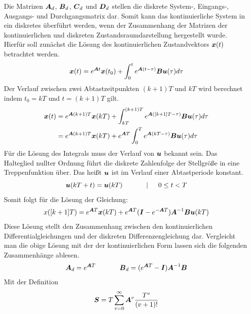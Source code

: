 Die Matrizen $\boldsymbol{A}_d$, $\boldsymbol{B}_d$, $\boldsymbol{C}_d$ und $\boldsymbol{D}_d$ stellen die diskrete System-, Eingangs-, Ausgangs- und Durchgangsmatrix dar. Somit kann das kontinuierliche System in ein diskretes überführt werden, wenn der Zusammenhang der Matrizen der kontinuierlichen und diskreten Zustandsraumdarstellung hergestellt wurde. Hierfür soll zunächst die Lösung des kontinuierlichen Zustandvektors $\boldsymbol{x}(t)$ betrachtet werden.
\begin{equation}
\boldsymbol{x}(t) = e^{\boldsymbol{A}t}\boldsymbol{x}(t_0)+\int^t_0 e^{\boldsymbol{A}(t-\tau)}\boldsymbol{B}\boldsymbol{u}(\tau)d\tau
\end{equation}
Der Verlauf zwischen zwei Abtastzeitpunkten $(k+1)T$ und $kT$ wird berechnet indem $t_0=kT$ und $t=(k+1)T$ gilt.
\begin{equation}
\begin{split}
\boldsymbol{x}(t) &= e^{\boldsymbol{A}(k+1)T}\boldsymbol{x}(kT)+\int^{(k+1)T}_{kT} e^{\boldsymbol{A}([k+1]T-\tau)}\boldsymbol{B}\boldsymbol{u}(\tau)d\tau \\
 &=  e^{\boldsymbol{A}(k+1)T}\boldsymbol{x}(kT)+e^{\boldsymbol{A}T}\int^{T}_{0} e^{\boldsymbol{A}(kT-\tau)}\boldsymbol{B}\boldsymbol{u}(\tau)d\tau
\end{split}
\end{equation}
Für die Lösung des Integrals muss der Verlauf von $\boldsymbol{u}$ bekannt sein. Das Halteglied nullter Ordnung führt die diskrete Zahlenfolge der Stellgröße in eine Treppenfunktion über. Das heißt $\boldsymbol{u}$ ist im Verlauf einer Abtastperiode konstant.
\begin{equation}
\boldsymbol{u}(kT+t)=\boldsymbol{u}(kT) \hspace{35pt} | \hspace{15pt} 0 \leq t < T
\end{equation}
Somit folgt für die Lösung der Gleichung:
\begin{equation}
x([k+1]T)=e^{\boldsymbol{A}T}\boldsymbol{x}(kT)+e^{\boldsymbol{A}T}(\boldsymbol{I}-e^{-\boldsymbol{A}T})\boldsymbol{A}^{-1}\boldsymbol{B}\boldsymbol{u}(kT)
\end{equation}
Diese Lösung stellt den Zusammenhang zwischen den kontinuierlichen Differentialgleichungen und der diskreten Differenzengleichung dar. Vergleicht man die obige Lösung mit der der kontinuierlichen Form lassen sich die folgenden Zusammenhänge ablesen.
\begin{equation}
\boldsymbol{A}_d=e^{\boldsymbol{A}T} \hspace{35pt}\boldsymbol{B}_d=(e^{\boldsymbol{A}T}-\boldsymbol{I})\boldsymbol{A}^{-1}\boldsymbol{B}
\end{equation}
Mit der Definition
\begin{equation}
\boldsymbol{S}=T\sum^{\infty}_{v=0}\boldsymbol{A}^v \frac{T^v}{(v+1)!}
\end{equation}
